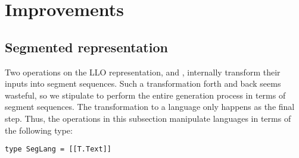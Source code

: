 \section{Improvements}
\label{sec:improvements}

\subsection{Segmented representation}
\label{sec:segm-repr}

Two operations on the LLO representation,  and
, internally transform their inputs into segment
sequences. Such a transformation forth and back seems wasteful, so we
stipulate to perform the entire generation process in terms of segment
sequences. The transformation to a language only happens as the final
step. Thus, the operations in this subsection manipulate languages in
terms of the following type:
\begin{lstlisting}[numbers=none]
type SegLang = [[T.Text]]
\end{lstlisting}

